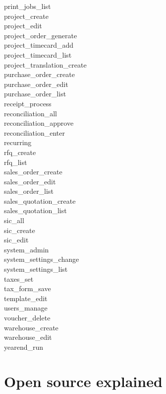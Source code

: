 \begin{description}
\item [print\_jobs\_list]
\item [project\_create]
\item [project\_edit]
\item [project\_order\_generate]
\item [project\_timecard\_add]
\item [project\_timecard\_list]
\item [project\_translation\_create]
\item [purchase\_order\_create]
\item [purchase\_order\_edit]
\item [purchase\_order\_list]
\item [receipt\_process]
\item [reconciliation\_all]
\item [reconciliation\_approve]
\item [reconciliation\_enter]
\item [recurring]
\item [rfq\_create]
\item [rfq\_list]
\item [sales\_order\_create]
\item [sales\_order\_edit]
\item [sales\_order\_list]
\item [sales\_quotation\_create]
\item [sales\_quotation\_list]
\item [sic\_all]
\item [sic\_create]
\item [sic\_edit]
\item [system\_admin]
\item [system\_settings\_change]
\item [system\_settings\_list]
\item [taxes\_set]
\item [tax\_form\_save]
\item [template\_edit]
\item [users\_manage]
\item [voucher\_delete]
\item [warehouse\_create]
\item [warehouse\_edit]
\item [yearend\_run]
\end{description}

\chapter{Open source explained}

